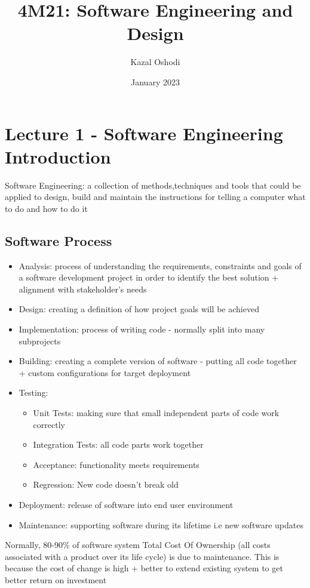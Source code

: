 \documentclass{article}
\title{4M21: Software Engineering and Design}
\author{Kazal Oshodi }
\date{January 2023}
\begin{document}
\maketitle
\tableofcontents

\section{Lecture 1 - Software Engineering Introduction}
Software Engineering: a collection of methods,techniques and tools that could be applied to design, build and maintain the instructions for telling a computer what to do and how to do it
\subsection{Software Process}\label{sp}
\begin{itemize}
    \item Analysis: process of understanding the requirements, constraints and goals of a software development project in order to identify the best solution + alignment with stakeholder's needs
    \item Design: creating a definition of how project goals will be achieved
    \item Implementation: process of writing code - normally split into many subprojects
    \item Building: creating a complete version of software - putting all code together + custom configurations for target deployment
    \item Testing: 
    \begin{itemize} 
    \item Unit Tests: making sure that small independent parts of code work correctly 
    \item Integration Tests: all code parts work together
    \item Acceptance: functionality meets requirements
    \item Regression: New code doesn't break old
    \end{itemize}
    \item Deployment: release of software into end user environment
    \item Maintenance: supporting software during its lifetime i.e new software updates
\end{itemize}
Normally, 80-90\% of software system Total Cost Of Ownership (all costs associated with a product over its life cycle) is due to maintenance. This is because the cost of change is high + better to extend existing system to get better return on investment
\end{document}
